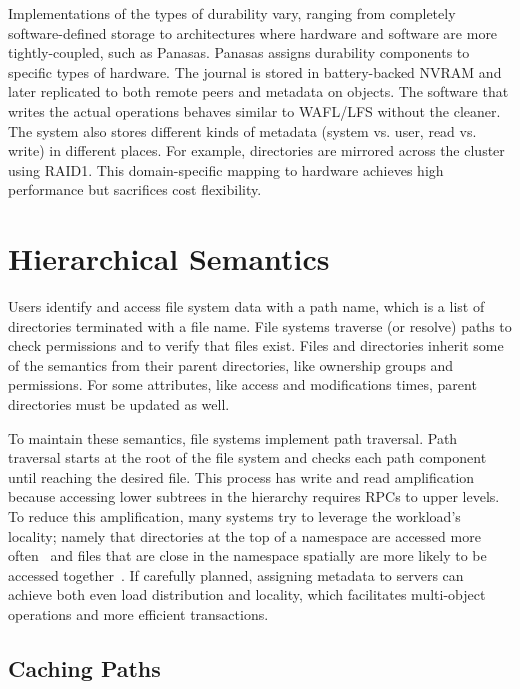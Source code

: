 Implementations of the types of durability vary, ranging from completely
software-defined storage to architectures where hardware and software are more
tightly-coupled, such as Panasas. Panasas assigns durability components to
specific types of hardware. The journal is stored in battery-backed NVRAM and
later replicated to both remote peers and metadata on objects. The software
that writes the actual operations behaves similar to WAFL/LFS without the
cleaner. The system also stores different kinds of metadata (system vs. user,
read vs. write) in different places. For example, directories are mirrored
across the cluster using RAID1. This domain-specific mapping to hardware
achieves high performance but sacrifices cost flexibility.

\section{Hierarchical Semantics}

Users identify and access file system data with a path name, which is a list of
directories terminated with a file name.  File systems traverse (or resolve)
paths to check permissions and to verify that files exist. Files and
directories inherit some of the semantics from their parent directories, like
ownership groups and permissions. For some attributes, like access and
modifications times, parent directories must be updated as well. 

To maintain these semantics, file systems implement path traversal. Path
traversal starts at the root of the file system and checks each path component
until reaching the desired file. This process has write and read amplification
because accessing lower subtrees in the hierarchy requires RPCs to upper
levels. To reduce this amplification, many systems try to leverage the
workload's locality; namely that directories at the top of a namespace are
accessed more often~\cite{ren:sc2014-indexfs} and files that are close in the
namespace spatially are more likely to be accessed
together~\cite{weil:osdi2006-ceph, weil:sc2004-dyn-metadata}.  If carefully
planned, assigning metadata to servers can achieve both even load distribution
and locality, which facilitates multi-object operations and more efficient
transactions.

\subsection{Caching Paths}

